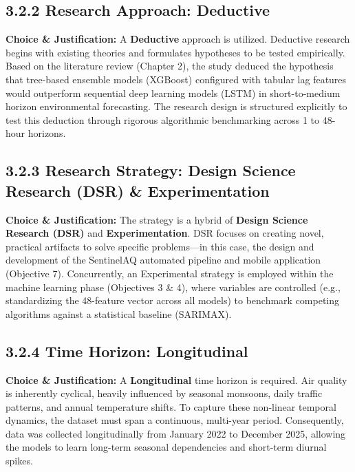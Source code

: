 \subsection{3.2.2 Research Approach:
Deductive}\label{research-approach-deductive}

\textbf{Choice \& Justification:} A \textbf{Deductive} approach is
utilized. Deductive research begins with existing theories and
formulates hypotheses to be tested empirically. Based on the literature
review (Chapter 2), the study deduced the hypothesis that tree-based
ensemble models (XGBoost) configured with tabular lag features would
outperform sequential deep learning models (LSTM) in short-to-medium
horizon environmental forecasting. The research design is structured
explicitly to test this deduction through rigorous algorithmic
benchmarking across 1 to 48-hour horizons.

\subsection{3.2.3 Research Strategy: Design Science Research (DSR) \&
Experimentation}\label{research-strategy-design-science-research-dsr-experimentation}

\textbf{Choice \& Justification:} The strategy is a hybrid of
\textbf{Design Science Research (DSR)} and \textbf{Experimentation}. DSR
focuses on creating novel, practical artifacts to solve specific
problems---in this case, the design and development of the SentinelAQ
automated pipeline and mobile application (Objective 7). Concurrently,
an Experimental strategy is employed within the machine learning phase
(Objectives 3 \& 4), where variables are controlled (e.g., standardizing
the 48-feature vector across all models) to benchmark competing
algorithms against a statistical baseline (SARIMAX).

\subsection{3.2.4 Time Horizon:
Longitudinal}\label{time-horizon-longitudinal}

\textbf{Choice \& Justification:} A \textbf{Longitudinal} time horizon
is required. Air quality is inherently cyclical, heavily influenced by
seasonal monsoons, daily traffic patterns, and annual temperature
shifts. To capture these non-linear temporal dynamics, the dataset must
span a continuous, multi-year period. Consequently, data was collected
longitudinally from January 2022 to December 2025, allowing the models
to learn long-term seasonal dependencies and short-term diurnal spikes.

